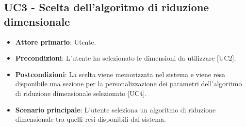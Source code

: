 \subsection{UC3 - Scelta dell'algoritmo di riduzione dimensionale}
\begin{itemize}
	\item \textbf{Attore primario}: Utente.
	\item \textbf{Precondizioni}: L'utente ha selezionato le dimensioni da utilizzare [UC2].
	\item \textbf{Postcondizioni}: La scelta viene memorizzata nel sistema e viene resa disponibile una sezione per la personalizzazione dei parametri dell'algoritmo di riduzione dimensionale selezionato [UC4].
	\item \textbf{Scenario principale}: L'utente seleziona un algoritmo di riduzione dimensionale tra quelli resi disponibili dal sistema.
\end{itemize}